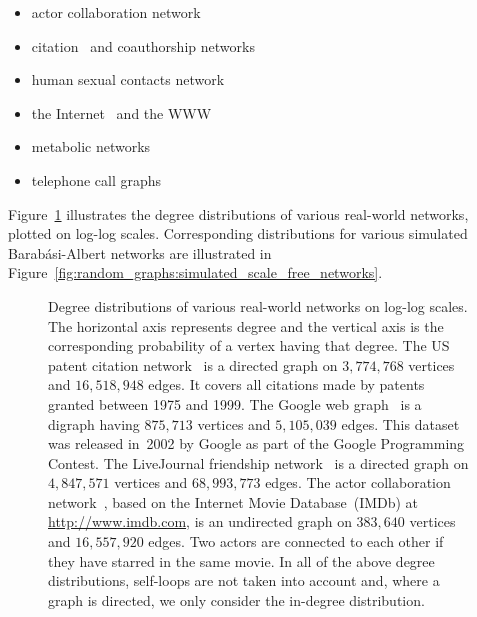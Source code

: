 \begin{itemize}
\item actor collaboration network~\cite{BarabasiAlbert1999}

\item citation~\cite{Price1965,Redner1998,Seglen1992} and
  coauthorship networks~\cite{Newman2001b}

\item human sexual contacts network~\cite{JonesHandcock2003,LiljerosEtAl2001}

\item the
  Internet~\cite{ChenEtAl2002,FaloutsosEtAl1999,VazquezEtAl2002} and
  the WWW~\cite{AlbertEtAl1999,BarabasiEtAl2000,BroderEtAl2000}

\item metabolic
  networks~\cite{JeongEtAl2001,JeongEtAl2000}

\item telephone call graphs~\cite{AielloEtAl2000,AielloEtAl2002}
\end{itemize}
Figure~\ref{fig:random_graphs:real_world_scale_free_networks}
illustrates the degree distributions of various real-world networks,
plotted on log-log scales. Corresponding distributions for various
simulated Barab\'asi-Albert networks are illustrated in
Figure~\ref{fig:random_graphs:simulated_scale_free_networks}.

\begin{figure}[!htbp]
\centering
{}

\caption{Degree distributions of various real-world networks on
  log-log scales. The horizontal axis represents degree and the
  vertical axis is the corresponding probability of a vertex having
  that degree. The US patent citation network~\cite{LeskovecEtAl2005}
  is a directed graph on $3,774,768$ vertices and $16,518,948$
  edges. It covers all citations made by patents granted between 1975
  and 1999. The Google web graph~\cite{LeskovecEtAl2008} is a digraph
  having $875,713$ vertices and $5,105,039$ edges. This dataset was
  released in~2002 by Google as part of the Google Programming
  Contest. The LiveJournal friendship
  network~\cite{BackstromEtAl2006,LeskovecEtAl2008} is a directed
  graph on $4,847,571$ vertices and $68,993,773$ edges. The actor
  collaboration network~\cite{BarabasiAlbert1999}, based on the
  Internet Movie Database~(IMDb) at \url{http://www.imdb.com}, is an
  undirected graph on $383,640$ vertices and $16,557,920$
  edges. Two actors are connected to each other if they have
  starred in the same movie. In all of the above degree distributions,
  self-loops are not taken into account and, where a graph is
  directed, we only consider the in-degree distribution.}
\label{fig:random_graphs:real_world_scale_free_networks}
\end{figure}

